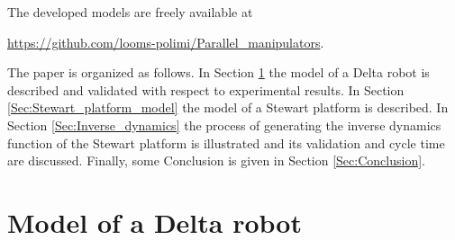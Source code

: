 \documentclass[]{interact}
\theoremstyle{plain}%
\theoremstyle{definition}
\theoremstyle{remark}
\begin{document}
The developed models are freely available at {\url{https://github.com/looms-polimi/Parallel_manipulators}.

The paper is organized as follows. In Section \ref{Sec:Delta_robot_model} the model of a Delta robot is described and validated with respect to experimental results. In Section \ref{Sec:Stewart_platform_model} the model of a Stewart platform is described. In Section \ref{Sec:Inverse_dynamics} the process of generating the inverse dynamics function of the Stewart platform is illustrated and its validation and cycle time are discussed. Finally, some Conclusion is given in Section \ref{Sec:Conclusion}.

\section{Model of a Delta robot}
\label{Sec:Delta_robot_model}

}
\end{document}
